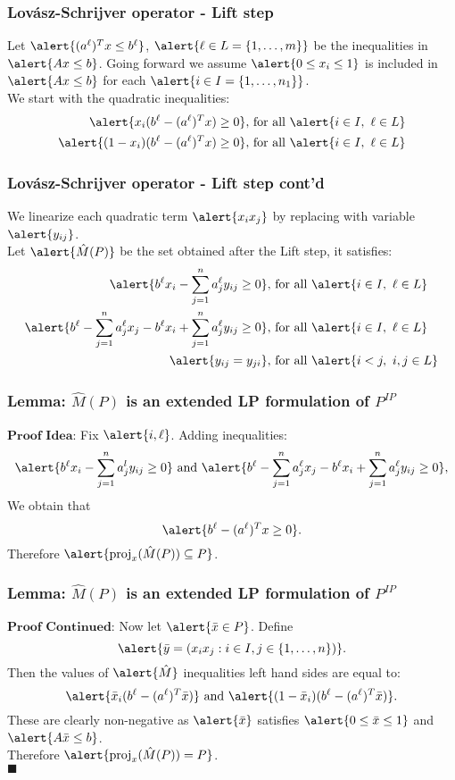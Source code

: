 \documentclass{beamer}
\DeclareMathOperator{\proj}{proj}
\begin{document}
\begin{frame}
\frametitle{Lov\'asz-Schrijver operator - Lift step}
Let $\alert{(a^\ell)^Tx \leq b^\ell}$, $\alert{\ell \in L = \{1, \dots, m\}}$ be the inequalities in $\alert{Ax \leq b}$. Going forward we assume $\alert{0 \leq x_i \leq 1}$ is included in $\alert{Ax \leq b}$ for each $\alert{i \in I = \{1,\dots,n_1\}}$.
\\ We start with the quadratic inequalities:
\begin{align*}
\alert{x_i(b^\ell - (a^\ell)^Tx) \geq 0}, &\text{ for all } \alert{i\in I,\ \ell \in L} \\
\alert{(1-x_i)(b^\ell - (a^\ell)^Tx) \geq 0}, &\text{ for all }\alert{ i\in I,\ \ell \in L} \\
\end{align*}
\end{frame}
\begin{frame}
\frametitle{Lov\'asz-Schrijver operator - Lift step cont'd}
We linearize each  quadratic term $\alert{x_{i}x_{j}}$ by replacing with variable $\alert{y_{ij}}$.\\
Let $\alert{\hat{M}(P)}$ be the set obtained after the Lift step, it satisfies:
\begin{align*}
\alert{b^\ell x_i - \sum_{j=1}^n a_j^\ell y_{ij} \geq 0}, &\text{ for all } \alert{i \in I,\ \ell \in L} \\
\alert{b^\ell - \sum_{j = 1}^n a^\ell_j x_j - b^\ell x_i + \sum_{j = 1}^n a_j^\ell y_{ij} \geq 0}, &\text{ for all } \alert{i \in I,\ \ell \in L} \\
\alert{y_{ij} = y_{ji}}, &\text{ for all } \alert{i<j,\ i,j \in L}
\end{align*}
\end{frame}

\begin{frame}
\frametitle{Lemma: $\hat{M}(P)$ is an extended LP formulation of $P^{IP}$}
$\textbf{Proof Idea:}$ Fix $\alert{i, \ell}$. Adding inequalities:
$$\alert{b^\ell x_i - \sum_{j=1}^n a_j^l y_{ij} \geq 0} \text{ and } \alert{b^\ell -\sum_{j=1}^n a_j^\ell x_j - b^\ell x_i + \sum_{j=1}^n a_j^\ell y_{ij} \geq 0},$$
We obtain that $$\alert{b^\ell -(a^\ell)^Tx \geq 0}.$$
Therefore $\alert{\proj_x(\hat{M}(P)) \subseteq P}$.
\end{frame}

\begin{frame}
\frametitle{Lemma: $\hat{M}(P)$ is an extended LP formulation of $P^{IP}$}
$\textbf{Proof Continued:}$ Now let $\alert{\bar{x} \in P}$. Define $$\alert{\bar{y}=(x_i x_j : i \in I, j \in \{1, \dots, n\})}.$$
Then the values of $\alert{\hat{M}}$ inequalities left hand sides are equal to:
$$\alert{\bar{x}_i (b^\ell - (a^\ell)^T \bar{x})} \text{ and } \alert{(1-\bar{x}_i )(b^\ell - (a^\ell)^T \bar{x})}.$$
These are clearly non-negative as $\alert{\bar{x}}$ satisfies $\alert{0 \leq \bar{x} \leq 1}$ and $\alert{A \bar{x} \leq b}$.\\
Therefore $\alert{\proj_x(\hat{M}(P)) = P}$.\\$\blacksquare$
\end{frame}
\end{document}
